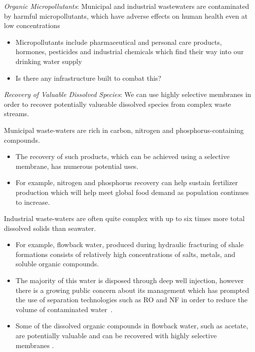   \textit{Organic Micropollutants}:
  Municipal and industrial wastewaters are contaminated by harmful
  micropollutants, which have adverse effects on human health even at low 
  concentrations\cite{schwarzenbach_challenge_2006}
  \begin{itemize}
    \item Micropollutants include pharmaceutical and personal care products, 
    hormones, pesticides and industrial chemicals which find their way into
    our drinking water supply
    \item Is there any infrastructure built to combat this?
  \end{itemize}
  
  \textit{Recovery of Valuable Dissolved Species}: We can use highly selective
  membranes in order to recover potentially valueable dissolved species from 
  complex waste streams. 
  
  Municipal waste-waters are rich in carbon, nitrogen and phosphorus-containing 
  compounds. 
  \begin{itemize}  
    \item The recovery of such products, which can be achieved using a 
    selective membrane, has numerous potential uses.\cite{sales_resource_2015}
    \item For example, nitrogen and phosphorus recovery can help sustain fertilizer 
    production which will help meet global food demand as population continues
    to increase.\cite{xie_membrane-based_2016}
  \end{itemize}

  Industrial waste-waters are often quite complex with up to six times more 
  total dissolved solids than seawater\cite{werber_materials_2016}. 
  \begin{itemize}
    \item For example, flowback water, produced during hydraulic fracturing of
    shale formations consists of relatively high concentrations of salts, metals,
    and soluble organic compounds. 
    \item The majority of this water is disposed through deep well injection, 
    however there is a growing public concern about its management which has 
    prompted the use of separation technologies such as RO and NF in order to 
    reduce the volume of contaminated water~\cite{gregory_water_2011}.
    \item Some of the dissolved organic compounds in flowback water, such as acetate, 
    are potentially valuable and can be recovered with highly selective membranes
    \cite{dischinger_application_2017}.
  \end{itemize}
  

